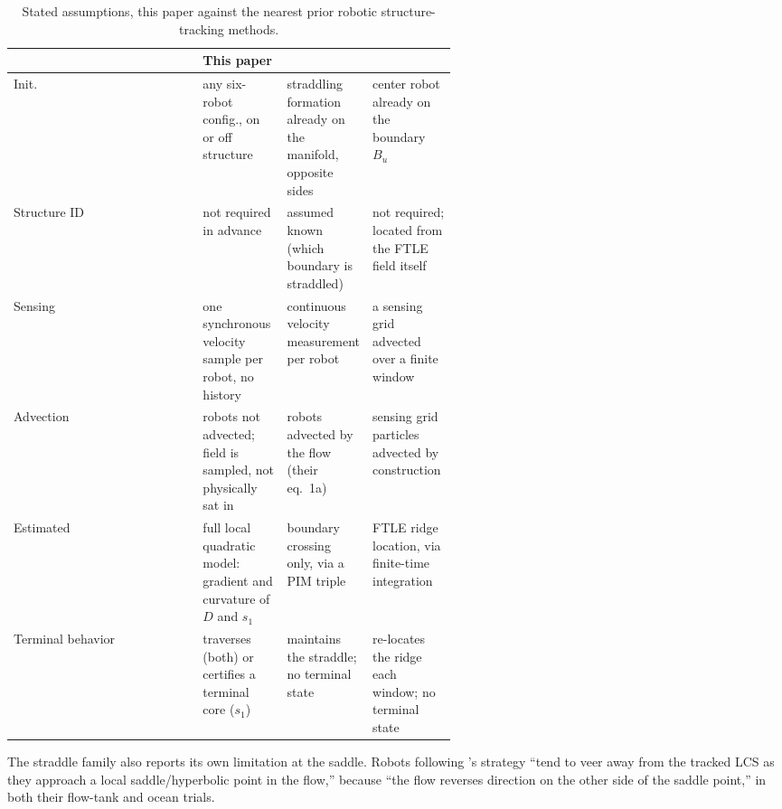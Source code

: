 \documentclass[lettersize,journal]{IEEEtran}
\begin{document}
\begin{table}[!t]
\centering
\caption{Stated assumptions, this paper against the nearest prior
robotic structure-tracking methods.}
\label{tab:assumptions}
\scriptsize
\setlength{\tabcolsep}{3pt}
\begin{tabular}{@{}l>{\raggedright\arraybackslash}p{0.19\linewidth}>{\raggedright\arraybackslash}p{0.19\linewidth}>{\raggedright\arraybackslash}p{0.19\linewidth}@{}}
\hline
& \textbf{This paper} & \textbf{\cite{17,18,19}} & \textbf{\cite{21}} \\
\hline
Init. & any six-robot config., on or off structure & straddling formation already on the manifold, opposite sides & center robot already on the boundary $B_u$ \\
Structure ID & not required in advance & assumed known (which boundary is straddled) & not required; located from the FTLE field itself \\
Sensing & one synchronous velocity sample per robot, no history & continuous velocity measurement per robot & a sensing grid advected over a finite window \\
Advection & robots not advected; field is sampled, not physically sat in & robots advected by the flow (their eq.~1a) & sensing grid particles advected by construction \\
Estimated & full local quadratic model: gradient and curvature of $D$ and $s_1$ & boundary crossing only, via a PIM triple & FTLE ridge location, via finite-time integration \\
Terminal behavior & traverses (both) or certifies a terminal core ($s_1$) & maintains the straddle; no terminal state & re-locates the ridge each window; no terminal state \\
\hline
\end{tabular}
\end{table}

The straddle family also reports its own limitation at the saddle.
Robots following \cite{17}'s strategy ``tend to veer away from the
tracked LCS as they approach a local saddle/hyperbolic point in the
flow,'' because ``the flow reverses direction on the other side of the
saddle point,'' in both their flow-tank and ocean trials.
\end{document}
